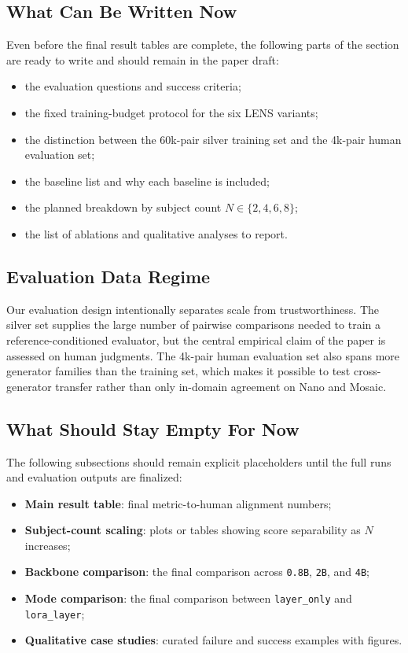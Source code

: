 \subsection{What Can Be Written Now}
Even before the final result tables are complete, the following parts of the section are ready to write and should remain in the paper draft:
\begin{itemize}
    \item the evaluation questions and success criteria;
    \item the fixed training-budget protocol for the six LENS variants;
    \item the distinction between the 60k-pair silver training set and the 4k-pair human evaluation set;
    \item the baseline list and why each baseline is included;
    \item the planned breakdown by subject count $N \in \{2,4,6,8\}$;
    \item the list of ablations and qualitative analyses to report.
\end{itemize}

\subsection{Evaluation Data Regime}
Our evaluation design intentionally separates scale from trustworthiness. The silver set supplies the large number of pairwise comparisons needed to train a reference-conditioned evaluator, but the central empirical claim of the paper is assessed on human judgments. The 4k-pair human evaluation set also spans more generator families than the training set, which makes it possible to test cross-generator transfer rather than only in-domain agreement on Nano and Mosaic.

\subsection{What Should Stay Empty For Now}
The following subsections should remain explicit placeholders until the full runs and evaluation outputs are finalized:
\begin{itemize}
    \item \textbf{Main result table}: final metric-to-human alignment numbers;
    \item \textbf{Subject-count scaling}: plots or tables showing score separability as $N$ increases;
    \item \textbf{Backbone comparison}: the final comparison across \texttt{0.8B}, \texttt{2B}, and \texttt{4B};
    \item \textbf{Mode comparison}: the final comparison between \texttt{layer\_only} and \texttt{lora\_layer};
    \item \textbf{Qualitative case studies}: curated failure and success examples with figures.
\end{itemize}

